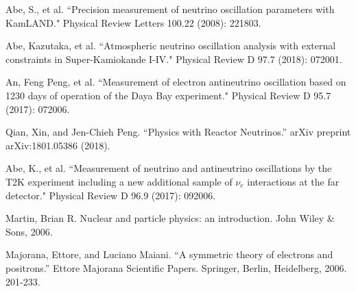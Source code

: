 \documentclass[preprint,12pt]{elsarticle}
\numberwithin{equation}{section}
\begin{document}
\begin{thebibliography}{00}


 Abe, S., et al. ``Precision measurement of neutrino oscillation parameters with KamLAND." Physical Review Letters 100.22 (2008): 221803.

 Abe, Kazutaka, et al. ``Atmospheric neutrino oscillation analysis with external constraints in Super-Kamiokande I-IV." Physical Review D 97.7 (2018): 072001.

 An, Feng Peng, et al. ``Measurement of electron antineutrino oscillation based on 1230 days of operation of the Daya Bay experiment." Physical Review D 95.7 (2017): 072006.

 Qian, Xin, and Jen-Chieh Peng. ``Physics with Reactor Neutrinos.'' arXiv preprint arXiv:1801.05386 (2018).

 Abe, K., et al. ``Measurement of neutrino and antineutrino oscillations by the T2K experiment including a new additional sample of $\nu_e$ interactions at the far detector." Physical Review D 96.9 (2017): 092006.






 Martin, Brian R. Nuclear and particle physics: an introduction. John Wiley \& Sons, 2006.

 Majorana, Ettore, and Luciano Maiani. ``A symmetric theory of electrons and positrons.'' Ettore Majorana Scientific Papers. Springer, Berlin, Heidelberg, 2006. 201-233.



\end{thebibliography}
\end{document}
